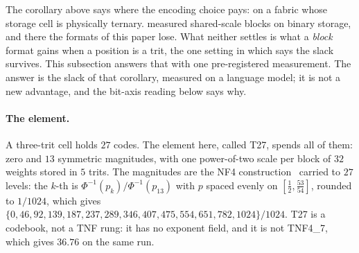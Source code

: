 The corollary above says where the encoding choice pays: on a fabric whose
storage cell is physically ternary.  measured
shared-scale blocks on binary storage, and there the formats of this paper
lose. What neither settles is what a \emph{block} format
gains when a position is a trit, the one setting in which
 says the slack survives. This subsection
answers that with one pre-registered measurement. The answer is the slack of
that corollary, measured on a language model; it is not a new advantage, and
the bit-axis reading below says why.

\paragraph{The element.} A three-trit cell holds $27$ codes. The element here,
called T27, spends all of them: zero and $13$ symmetric magnitudes, with one
power-of-two scale per block of $32$ weights stored in $5$ trits. The magnitudes
are the NF4 construction~\cite{qlora} carried to $27$ levels: the $k$-th is
$\Phi^{-1}(p_k)/\Phi^{-1}(p_{13})$ with $p$ spaced evenly on
$[\tfrac12,\tfrac{53}{54}]$, rounded to $1/1024$, which gives
$\{0,46,92,139,187,237,289,346,407,475,554,651,782,1024\}/1024$. T27 is a
codebook, not a TNF rung: it has no exponent field, and it is not TNF4\_7, which
gives $36.76$ on the same run.

